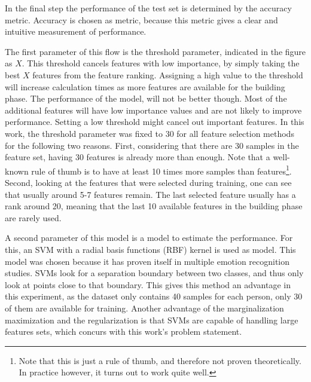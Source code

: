 \npar

In the final step the performance of the test set is determined by the accuracy metric. Accuracy is chosen as metric, because this metric gives a clear and intuitive measurement of performance.

\npar

The first parameter of this flow is the threshold parameter, indicated in the figure as $X$. This threshold cancels features with low importance, by simply taking the best $X$ features from the feature ranking. Assigning a high value to the threshold will increase calculation times as more features are available for the building phase. The performance of the model, will not be better though. Most of the additional features will have low importance values and are not likely to improve performance. Setting a low threshold might cancel out important features. 
In this work, the threshold parameter was fixed to 30 for all feature selection methods for the following two reasons. First, considering that there are 30 samples in the feature set, having 30 features is already more than enough. Note that a well-known rule of thumb is to have at least 10 times more samples than features\citep{rot1,rot2}\footnote{Note that this is just a rule of thumb, and therefore not proven theoretically. In practice however, it turns out to work quite well.}. Second, looking at the features that were selected during training, one can see that usually around 5-7 features remain. The last selected feature usually has a rank around 20, meaning that the last 10 available features in the building phase are rarely used.

\npar
A second parameter of this model is a model to estimate the performance. For this, an SVM with a radial basis functions (RBF) kernel is used as model. This model was chosen because it has proven itself in multiple emotion recognition studies\citep{killyPaper,emorecoghard,SVMUsage,SVMUsage2}. SVMs look for a separation boundary between two classes, and thus only look at points close to that boundary. This gives this method an advantage in this experiment, as the dataset only contains 40 samples for each person, only 30 of them are available for training. Another advantage of the marginalization maximization and the regularization is that SVMs are capable of handling large features sets\citep{SVMLargeFeatSets,SVMLargeFeatSets2}, which concurs with this work's problem statement.

\npar

